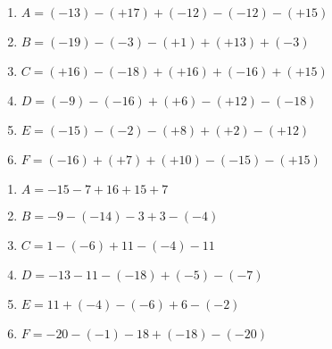 \documentclass[11pt]{article}
\begin{document}
\begin{exercice}
\begin{multicols}{2}
\begin{enumerate}[label={}]
	\item \begin{minipage}[t]{\linewidth} $ A =  (-13)-(+17)+(-12)-(-12)-(+15)$ \end{minipage}
	\item \begin{minipage}[t]{\linewidth} $ B =  (-19)-(-3)-(+1)+(+13)+(-3)$ \end{minipage}
	\item \begin{minipage}[t]{\linewidth} $ C =  (+16)-(-18)+(+16)+(-16)+(+15)$ \end{minipage}
	\item \begin{minipage}[t]{\linewidth} $ D =  (-9)-(-16)+(+6)-(+12)-(-18)$ \end{minipage}
	\item \begin{minipage}[t]{\linewidth} $ E =  (-15)-(-2)-(+8)+(+2)-(+12)$ \end{minipage}
	\item \begin{minipage}[t]{\linewidth} $ F =  (-16)+(+7)+(+10)-(-15)-(+15)$ \end{minipage}
\end{enumerate}
\end{multicols}
\end{exercice}

 
\begin{exercice}
\begin{multicols}{2}
\begin{enumerate}[label={}]
	\item \begin{minipage}[t]{\linewidth} $ A =  -15-7+16+15+7$ \end{minipage}
	\item \begin{minipage}[t]{\linewidth} $ B =  -9-(-14)-3+3-(-4)$ \end{minipage}
	\item \begin{minipage}[t]{\linewidth} $ C =  1-(-6)+11-(-4)-11$ \end{minipage}
	\item \begin{minipage}[t]{\linewidth} $ D =  -13-11-(-18)+(-5)-(-7)$ \end{minipage}
	\item \begin{minipage}[t]{\linewidth} $ E =  11+(-4)-(-6)+6-(-2)$ \end{minipage}
	\item \begin{minipage}[t]{\linewidth} $ F =  -20-(-1)-18+(-18)-(-20)$ \end{minipage}
\end{enumerate}
\end{multicols}
\end{exercice}
\end{document}
